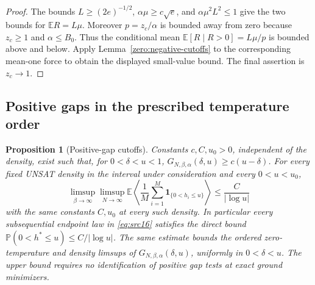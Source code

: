 \documentclass[11pt,a4paper]{article}
\numberwithin{equation}{section}
\newtheorem{proposition}[theorem]{Proposition}
\theoremstyle{definition}
\theoremstyle{remark}
\newcommand{\E}{\mathbb E}
\newcommand{\Prob}{\mathbb P}
\newcommand{\ind}{\mathbf 1}
\begin{document}
\begin{proof}
The bounds \(L\ge(2e)^{-1/2}\), \(\alpha\mu\ge c\sqrt e\), and
\(\alpha\mu^2L^2\le1\) give the two bounds for \(\E R=L\mu\).
Moreover \(p=z_c/\alpha\) is bounded away from zero because
\(z_c\ge1\) and \(\alpha\le B_0\).  Thus the conditional mean
\(\E[R\mid R>0]=L\mu/p\) is bounded above and below.
Apply Lemma~\ref{zero:negative-cutoffs} to the corresponding
mean-one force to obtain the displayed small-value bound.
The final assertion is \(z_c\to1\).
\end{proof}

\subsection{Positive gaps in the prescribed temperature order}

\begin{proposition}[Positive-gap cutoffs]\label{zero:positive-cutoffs}
Constants \(c,C,u_0>0\), independent of the density, exist such
that, for \(0<\delta<u<1\),
\(G_{N,\beta,\alpha}(\delta,u)\ge c(u-\delta)\).
For every fixed UNSAT density in the interval under consideration
and every \(0<u<u_0\),
\begin{equation}\label{zero:direct-positive-cutoff}
 \limsup_{\beta\to\infty}\limsup_{N\to\infty}
 \E\left\langle\frac1M\sum_{i=1}^M
       \ind_{\{0<h_i\le u\}}\right\rangle
 \le\frac C{|\log u|}
\end{equation}
with the same constants \(C,u_0\) at every such density.
In particular every subsequential endpoint law in
\eqref{eq:src16} satisfies the direct bound
\(\Prob(0<h^*\le u)\le C/|\log u|\).
The same estimate bounds the ordered zero-temperature and density
limsups of \(G_{N,\beta,\alpha}(\delta,u)\), uniformly in
\(0<\delta<u\).
The upper bound requires no identification of positive gap tests at
exact ground minimizers.
\end{proposition}
\end{document}
